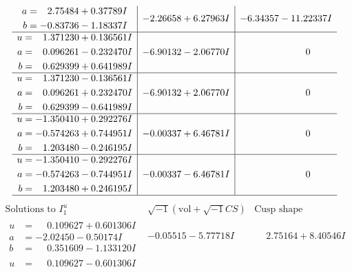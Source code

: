 \documentclass[1p]{elsarticle_modified}
\theoremstyle{definition}
\newcommand{\I}{\sqrt{-1}}
\begin{document}
$$\begin{array}{c|c|c}
\begin{aligned}
a &= \phantom{-}2.75484 + 0.37789 I \\
b &= -0.83736 - 1.18337 I\end{aligned}
 & -2.26658 + 6.27963 I & -6.34357 - 11.22337 I \\ \hline\begin{aligned}
u &= \phantom{-}1.371230 + 0.136561 I \\
a &= \phantom{-}0.096261 - 0.232470 I \\
b &= \phantom{-}0.629399 + 0.641989 I\end{aligned}
 & -6.90132 - 2.06770 I & \phantom{-0.000000 } 0 \\ \hline\begin{aligned}
u &= \phantom{-}1.371230 - 0.136561 I \\
a &= \phantom{-}0.096261 + 0.232470 I \\
b &= \phantom{-}0.629399 - 0.641989 I\end{aligned}
 & -6.90132 + 2.06770 I & \phantom{-0.000000 } 0 \\ \hline\begin{aligned}
u &= -1.350410 + 0.292276 I \\
a &= -0.574263 + 0.744951 I \\
b &= \phantom{-}1.203480 - 0.246195 I\end{aligned}
 & -0.00337 + 6.46781 I & \phantom{-0.000000 } 0 \\ \hline\begin{aligned}
u &= -1.350410 - 0.292276 I \\
a &= -0.574263 - 0.744951 I \\
b &= \phantom{-}1.203480 + 0.246195 I\end{aligned}
 & -0.00337 - 6.46781 I & \phantom{-0.000000 } 0\\
 \hline 
 \end{array}$$\newpage$$\begin{array}{c|c|c}  
\text{Solutions to }I^u_{1}& \I (\text{vol} + \sqrt{-1}CS) & \text{Cusp shape}\\
 \hline 
\begin{aligned}
u &= \phantom{-}0.109627 + 0.601306 I \\
a &= -2.02450 - 0.50174 I \\
b &= \phantom{-}0.351609 - 1.133120 I\end{aligned}
 & -0.05515 - 5.77718 I & \phantom{-}2.75164 + 8.40546 I \\ \hline\begin{aligned}
u &= \phantom{-}0.109627 - 0.601306 I \\

\end{aligned}
\end{array}$$
\end{document}

